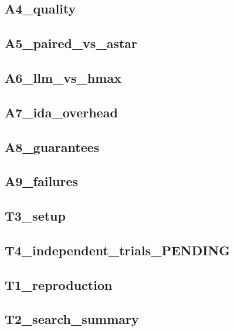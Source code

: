 \documentclass{article}
\begin{document}
\subsection*{A4\_\allowbreak{}quality}

\clearpage
\subsection*{A5\_\allowbreak{}paired\_\allowbreak{}vs\_\allowbreak{}astar}

\clearpage
\subsection*{A6\_\allowbreak{}llm\_\allowbreak{}vs\_\allowbreak{}hmax}

\clearpage
\subsection*{A7\_\allowbreak{}ida\_\allowbreak{}overhead}

\clearpage
\subsection*{A8\_\allowbreak{}guarantees}

\clearpage
\subsection*{A9\_\allowbreak{}failures}

\clearpage
\subsection*{T3\_\allowbreak{}setup}

\clearpage
\subsection*{T4\_\allowbreak{}independent\_\allowbreak{}trials\_\allowbreak{}PENDING}

\clearpage
\subsection*{T1\_\allowbreak{}reproduction}

\clearpage
\subsection*{T2\_\allowbreak{}search\_\allowbreak{}summary}

\end{document}
